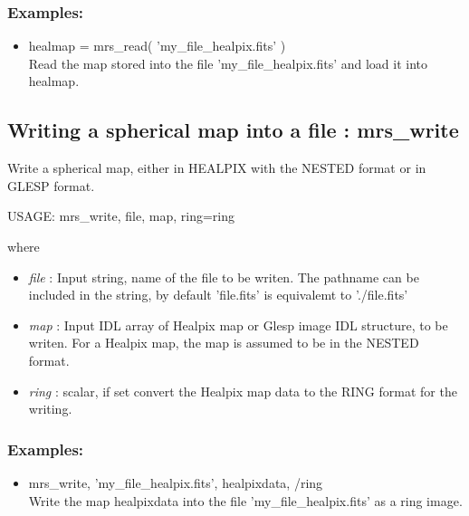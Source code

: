 \subsubsection*{Examples:} 
\begin{itemize}
\item healmap = mrs\_read( 'my\_file\_healpix.fits' ) \\
Read the map stored into the file 'my\_file\_healpix.fits' and load it into healmap.
\end{itemize}



\subsection{Writing a spherical map into a file : mrs\_write}
Write a spherical map, either in HEALPIX with the NESTED format or in GLESP format.
{\bf
\begin{center}
     USAGE: mrs\_write, file, map, ring=ring
\end{center}}
where
\begin{itemize}
\item {\em file} : Input string, name of the file to be writen. The pathname can be included in the string, by default 'file.fits' is equivalemt to './file.fits'
\item {\em map} : Input IDL array of Healpix map or Glesp image IDL structure, to be writen. For a Healpix map, the map is assumed to be in the NESTED format.
\item {\em ring} : scalar, if set convert the Healpix map data to the RING format for the writing.
\end{itemize}

\subsubsection*{Examples:} 
\begin{itemize}
\item mrs\_write, 'my\_file\_healpix.fits', healpixdata, /ring \\
Write the map healpixdata into the file 'my\_file\_healpix.fits' as a ring image.
\end{itemize}



